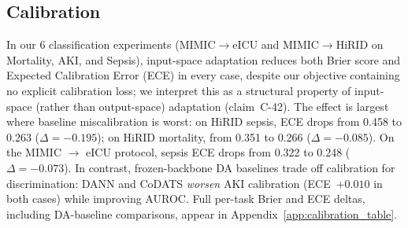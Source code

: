 \subsection{Calibration}
\label{sec:calibration}
In our 6 classification experiments (MIMIC$\to$eICU and MIMIC$\to$HiRID on
Mortality, AKI, and Sepsis), input-space adaptation reduces both Brier score
and Expected Calibration Error (ECE) in every case, despite our objective
containing no explicit calibration loss; we interpret this as a structural
property of input-space (rather than output-space) adaptation (claim~C-42).
The effect is largest where baseline miscalibration is worst: on HiRID
sepsis, ECE drops from 0.458 to 0.263 ($\Delta=-0.195$); on HiRID mortality,
from 0.351 to 0.266 ($\Delta=-0.085$). On the MIMIC $\to$ eICU protocol,
sepsis ECE drops from 0.322 to 0.248 ($\Delta=-0.073$). In contrast,
frozen-backbone DA baselines trade off calibration for discrimination: DANN
and CoDATS \emph{worsen} AKI calibration (ECE~$+0.010$ in both cases) while
improving AUROC. Full per-task Brier and ECE deltas, including DA-baseline
comparisons, appear in Appendix~\ref{app:calibration_table}.

